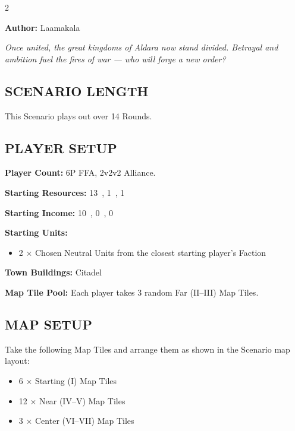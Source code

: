 
\begin{multicols*}{2}

\textbf{Author:} Laamakala

\textit{Once united, the great kingdoms of Aldara now stand divided. Betrayal and ambition fuel the fires of war — who will forge a new order?}  %

\subsection*{\MakeUppercase{Scenario Length}}
This Scenario plays out over 14 Rounds.

\subsection*{\MakeUppercase{Player Setup}}
\textbf{Player Count:} 6P FFA, 2v2v2 Alliance.

\textbf{Starting Resources:} 13~, 1~, 1~

\textbf{Starting Income:} 10~, 0~, 0~

\textbf{Starting Units:}

\begin{itemize}
  \item 2 × Chosen Neutral  Units from the closest starting player's Faction
\end{itemize}

\textbf{Town Buildings:} Citadel

\textbf{Map Tile Pool:} Each player takes 3 random Far (II--III) Map Tiles.

\subsection*{\MakeUppercase{Map Setup}}
Take the following Map Tiles and arrange them as shown in the Scenario map layout:

\begin{itemize}
  \item 6 × Starting (I) Map Tiles
  \item 12 × Near (IV--V) Map Tiles
  \item 3 × Center (VI--VII) Map Tiles
\end{itemize}


\end{multicols*}
